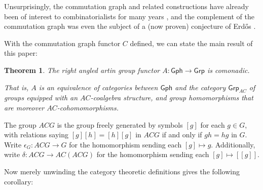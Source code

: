 \documentclass[microtype]{gtpart}
\newtheorem*{thm*}{Theorem}
\theoremstyle{definition}
\theoremstyle{theorem}
\newcommand{\Gph}{\mathsf{Gph}}
\begin{document}
  Unsurprisingly, the commutation graph and related constructions have already 
  been of interest to combinatorialists for many years 
  \cite{baumeisterCommutingGraphsOdd2009,
  dolinarMaximalDistancesCommuting2012,
  giudiciDiametersCommutingGraphs2010,
  arvindRecognizingCommutingGraph2022,
  cameronGraphsDefinedGroups2022}, and the complement of the commutation 
  graph was even the subject of a (now proven) conjecture of Erd\H{o}s
  \cite{neumannProblemPaulErdos1976}.

  With the commutation graph functor $C$ defined, we can state the main result
  of this paper:

  \begin{thm*}
    The right angled artin group functor $A : \mathsf{Gph} \to \mathsf{Grp}$ is comonadic. 

    That is, $A$ is an equivalence of categories between $\Gph$ and 
    the category $\mathsf{Grp}_{AC}$ of groups equipped with an $AC$-coalgebra structure,
    and group homomorphisms that are moreover $AC$-cohomomorphisms. 
  \end{thm*}

  The group $ACG$ is the group freely generated by symbols $[g]$ for each $g \in G$, 
  with relations saying $[g][h] = [h][g]$ in $ACG$ if and only if $gh = hg$ in $G$. 
  Write $\epsilon_G : ACG \to G$ for the homomorphism sending each $[g] \mapsto g$.
  Additionally, write $\delta : ACG \to AC(ACG)$ for the homomorphism sending each
  $[g] \mapsto [[g]]$.

  Now merely unwinding the category theoretic definitions gives the following corollary:
\end{document}
